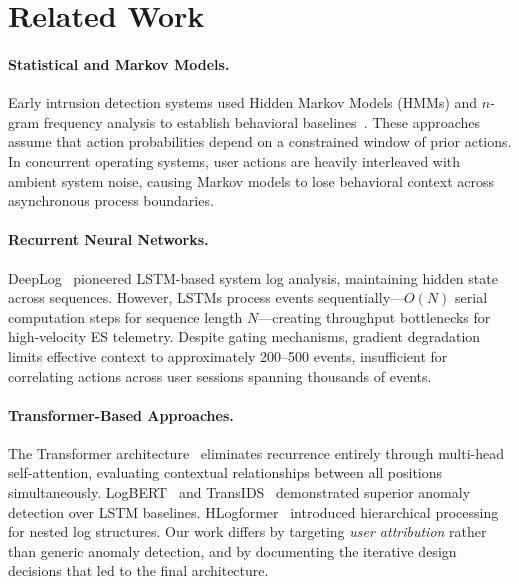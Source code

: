\documentclass[letterpaper,twocolumn,10pt]{article}
\begin{document}

\section{Related Work}
\label{sec:related}

\paragraph{Statistical and Markov Models.}
Early intrusion detection systems used Hidden Markov Models (HMMs)
and $n$-gram frequency analysis to establish behavioral
baselines~\cite{forrest96}.  These approaches assume that action
probabilities depend on a constrained window of prior actions.  In
concurrent operating systems, user actions are heavily interleaved
with ambient system noise, causing Markov models to lose behavioral
context across asynchronous process boundaries.

\paragraph{Recurrent Neural Networks.}
DeepLog~\cite{deeplog} pioneered LSTM-based system log analysis,
maintaining hidden state across sequences.  However, LSTMs process
events sequentially---$O(N)$ serial computation steps for sequence
length $N$---creating throughput bottlenecks for high-velocity ES
telemetry.  Despite gating mechanisms, gradient degradation limits
effective context to approximately 200--500 events, insufficient
for correlating actions across user sessions spanning thousands of
events.

\paragraph{Transformer-Based Approaches.}
The Transformer architecture~\cite{vaswani} eliminates recurrence
entirely through multi-head self-attention, evaluating contextual
relationships between all positions simultaneously.
LogBERT~\cite{logbert} and TransIDS~\cite{transids} demonstrated
superior anomaly detection over LSTM baselines.
HLogformer~\cite{hlogformer} introduced hierarchical processing for
nested log structures.  Our work differs by targeting \emph{user
attribution} rather than generic anomaly detection, and by
documenting the iterative design decisions that led to the final
architecture.
\end{document}
